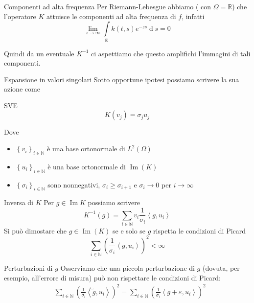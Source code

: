 \documentclass{beamer}
\theoremstyle{plain}
\theoremstyle{definition}
\theoremstyle{remark}
\newcommand{\set}[1]{\left\{#1\right\}}
\newcommand{\pa}[1]{\left(#1\right)}
\newcommand{\ang}[1]{\left<#1\right>}
\newcommand{\intl}{\int \limits}
\DeclareMathOperator{\de}{d}
\DeclareMathOperator{\im}{Im}
\begin{document}
\begin{frame}{Componenti ad alta frequenza}
  Per Riemann-Lebesgue abbiamo ( con $\Omega = \mathbb{R}$) che
  l'operatore $K$ attuisce le componenti ad alta frequenza di $f$,
  infatti
  \[ \lim _{z \to \infty} \intl _\mathbb{R} k(t,s) e^{-zs} \de s =
  0 \]

  Quindi da un eventuale $K^{-1}$ ci aspettiamo che questo amplifichi
  l'immagini di tali componenti.
\end{frame}

\begin{frame}{Espansione in valori singolari}
  Sotto opportune ipotesi possiamo scrivere la sua azione come
  \begin{block}{SVE}
    \[ K(v_j) = \sigma _j u_j \]
  \end{block}
  Dove
  \begin{itemize}
  \item $\set{v_i}_{i\in \mathbb{N}}$ è una base ortonormale di
    $L^2(\Omega)$
  \item $\set{u_i}_{i\in \mathbb{N}}$ è una base ortonormale di
    $\im(K)$
  \item $\set{\sigma _i}_{i\in \mathbb{N}}$ sono nonnegativi, $\sigma
    _i \ge \sigma _{i+1}$ e $\sigma _i \to 0$ per $i \to \infty$
  \end{itemize}
\end{frame}

\begin{frame}{Inversa di $K$}
  Per $g \in \im{K}$ possiamo scrivere
  \[ K^{-1}(g) = \sum _{i\in \mathbb{N}} v_i \frac{1}{\sigma _i}
  \ang{g,u_i} \]
  \vfill
  Si può dimostare che $g\in \im (K)$ se e solo se $g$ rispetta le
  condizioni di Picard
  \[ \sum _{i\in \mathbb{N}} \pa{ \frac{1}{\sigma _i} \ang{g,u_i}} ^2
  < \infty \]
\end{frame}

\begin{frame}{Perturbazioni di $g$}
  Osserviamo che una piccola perturbazione di $g$ (dovuta, per
  esempio, all'errore di misura) può non rispettare le condizioni di
  Picard:
  \begin{align*}
    & \sum _{i\in \mathbb{N}} \pa{ \frac{1}{\sigma _i} \ang{\tilde
        g,u_i}} ^2 = \sum _{i\in \mathbb{N}} \pa{ \frac{1}{\sigma _i}
      \ang{g + \varepsilon,u_i}} ^2
  \end{align*}
\end{frame}
\end{document}
